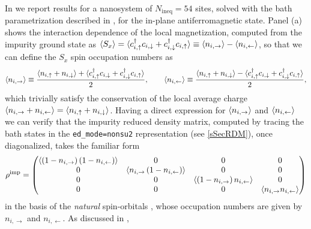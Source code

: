 \documentclass[edipack_sp.tex]{subfiles}
\begin{document}
In  we report results for a nanosystem of 
$N_\mathrm{ineq}=54$ sites, solved with the bath parametrization 
described in , for the in-plane 
antiferromagnetic state.
Panel (a) shows the interaction dependence of the local magnetization,
computed from the impurity ground state as  
$ \langle S_x \rangle = \langle c^\dagger_{i,\uparrow} c_{i,\downarrow} + c^\dagger_{i,\downarrow} c_{i,\uparrow} \rangle \equiv \langle n_{i,\rightarrow} \rangle - \langle n_{i,\leftarrow} \rangle$,
so that we can define the $S_x$ spin occupation numbers as
\begin{equation*}
    \langle n_{i,\rightarrow} \rangle \equiv \frac{\langle n_{i,\uparrow} + n_{i,\downarrow} \rangle +
    \langle c^\dagger_{i,\uparrow} c_{i,\downarrow} + c^\dagger_{i,\downarrow} c_{i,\uparrow} \rangle}{2},
    \qquad
    \langle n_{i,\leftarrow} \rangle \equiv \frac{\langle n_{i,\uparrow} + n_{i,\downarrow} \rangle -
    \langle c^\dagger_{i,\uparrow} c_{i,\downarrow} + c^\dagger_{i,\downarrow} c_{i,\uparrow} \rangle}{2},
\end{equation*}
which trivially satisfy the conservation of the local average charge $\langle n_{i,\rightarrow} + n_{i,\leftarrow} \rangle = \langle n_{i,\uparrow} + n_{i,\downarrow} \rangle$.
Having a direct expression for $\langle n_{i,\rightarrow} \rangle$ and $\langle n_{i,\leftarrow} \rangle$
we can verify that the impurity reduced density matrix, computed by 
tracing the bath states in the \texttt{ed\_mode=nonsu2} representation 
(see \ref{sSecRDM}), once diagonalized, takes the familiar form
\cite{Zanardi2002PRA,Su2013MPLB,Walsh2019PRL} 
\begin{equation}
    \rho^\mathrm{imp} = 
     \begin{pmatrix}
            \left\langle\left(1-n_{i,\rightarrow}\right)\left(1-n_{i,\leftarrow}\right)\right\rangle   &    0          &       0       &   0 \\
                    0       &    \left\langle n_{i,\rightarrow}\left(1-n_{i,\leftarrow}\right)\right\rangle  &       0       &   0 \\
                   0       &       0   &    \left\langle\left(1-n_{i,\rightarrow}\right)n_{i,\leftarrow}\right\rangle      &   0 \\
                    0       &       0   &       0          &    \left\langle n_{i,\rightarrow} n_{i,\leftarrow}\right\rangle
        \end{pmatrix} 
\end{equation}
in the basis of the {\it natural} spin-orbitals
\cite{BellomiaPhD,BellomiaKMH,Bellomia_intracorr}, 
whose occupation numbers
are given by $n_{i,\rightarrow}$ and $n_{i,\leftarrow}$.
As  discussed in \cite{BellomiaPhD,BellomiaKMH,Bellomia_intracorr},
\end{document}
